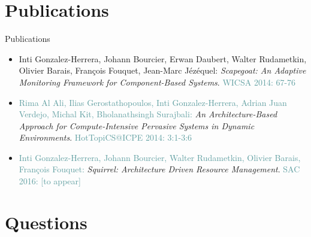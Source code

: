 \documentclass[10pt,xcolor={dvipsnames}]{beamer}
\begin{document}
	
	\section[Publications]{Publications}
	
	\begin{frame}{Publications}
		\begin{footnotesize}
			\begin{itemize}\setlength{\itemsep}{0.8cm}
				\item {\color{CadetBlue} Inti Gonzalez-Herrera, Johann Bourcier, Erwan Daubert, Walter Rudametkin, Olivier Barais, François Fouquet, Jean-Marc Jézéquel:}
				\textit{Scapegoat: An Adaptive Monitoring Framework for Component-Based Systems}. \textcolor{CadetBlue}{WICSA 2014: 67-76}
				
				\item \textcolor{CadetBlue}{Rima Al Ali, Ilias Gerostathopoulos, Inti Gonzalez-Herrera, Adrian Juan Verdejo, Michal Kit, Bholanathsingh Surajbali:}
				\textit{An Architecture-Based Approach for Compute-Intensive Pervasive Systems in Dynamic Environments}. \textcolor{CadetBlue}{HotTopiCS@ICPE 2014: 3:1-3:6}
				
				\item \textcolor{CadetBlue}{Inti Gonzalez-Herrera, Johann Bourcier, Walter Rudametkin, Olivier Barais, François Fouquet:}
				\textit{Squirrel: Architecture Driven Resource Management}. \textcolor{CadetBlue}{SAC 2016: [to appear]}
			\end{itemize}
		\end{footnotesize}
		
	\end{frame}
	
	\section[Questions]{Questions}
	
\end{document}
